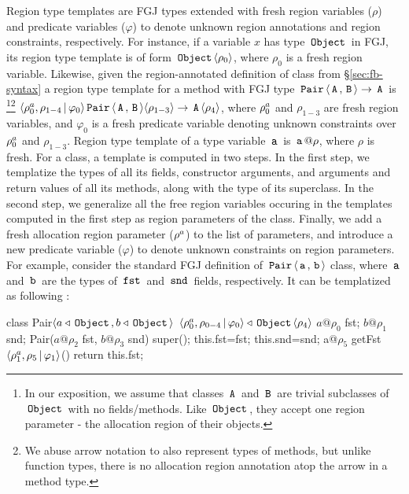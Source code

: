 Region type templates are FGJ types extended with fresh region
variables ($\rho$) and predicate variables ($\varphi$) to denote
unknown region annotations and region constraints, respectively. For
instance, if a variable $x$ has type $\,{\tt Object}\,$ in FGJ, its region type
template is of form $\,{\tt Object}\,\langle \rho_0 \rangle$, where $\rho_0$ is a fresh
region variable. Likewise, given the region-annotated definition of
 class from \S\ref{sec:fb-syntax} a region type template for a
method with FGJ type $\,{\tt Pair}\,\langle \,{\tt A}\,,\,{\tt B}\, \rangle \rightarrow \,{\tt A}\,$
is \footnote{In our exposition, we assume that classes $\,{\tt A}\,$ and
$\,{\tt B}\,$ are trivial subclasses of $\,{\tt Object}\,$ with no fields/methods. Like
$\,{\tt Object}\,$, they accept one region parameter - the allocation region of
their objects.}\footnote{We abuse arrow notation to also represent
types of methods, but unlike function types, there is no allocation
region annotation atop the arrow in a method type.}
$\langle \rho^a_0,\rho_{1-4} \,|\, \varphi_0 \rangle
\,{\tt Pair}\,\langle \,{\tt A}\,,\,{\tt B}\, \rangle \langle \rho_{1-3} \rangle \rightarrow
\,{\tt A}\,\langle \rho_4 \rangle$, where $\rho^a_0$ and $\rho_{1-3}$ are fresh region
variables, and $\varphi_0$ is a fresh predicate variable denoting
unknown constraints over $\rho^a_0$ and $\rho_{1-3}$.  Region type
template of a type variable $\,{\tt a}\,$ is $\,{\tt a}\,@\rho$, where $\rho$ is
fresh. For a class, a template is computed in two steps. In the first
step, we templatize the types of all its fields, constructor
arguments, and arguments and return values of all its methods, along
with the type of its superclass. In the second step, we generalize all
the free region variables occuring in the templates computed in the
first step as region parameters of the class. Finally, we add a fresh
allocation region parameter ($\rho^a$) to the list of parameters,
and introduce a new predicate variable ($\varphi$) to denote unknown
constraints on region parameters. For example, consider the standard
FGJ definition of $\,{\tt Pair}\,\langle \,{\tt a}\,,\,{\tt b}\, \rangle$ class, where $\,{\tt a}\,$
and $\,{\tt b}\,$ are the types of $\,{\tt fst}\,$ and $\,{\tt snd}\,$ fields,
respectively. It can be templatized as following :
\vspace*{-0.1in}
\begin{center}
\begin{codejava}
class Pair$\langle a\triangleleft\,{\tt Object}\,, b\triangleleft\,{\tt Object}\, \rangle$
          $\langle \rho^a_0,\rho_{0-4}\,|\,\varphi_0 \rangle \triangleleft \,{\tt Object}\,\langle \rho_4 \rangle$ {
  $a@\rho_0$ fst; $b@\rho_1$ snd;
  Pair($a@\rho_2$ fst, $b@\rho_3$ snd) { 
    super(); this.fst=fst; this.snd=snd; 
  }
  a@$\rho_5$ getFst$\langle \rho^a_1,\rho_5\,|\,\varphi_1 \rangle$() { return this.fst; }
}
\end{codejava}
\end{center}
